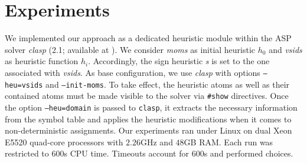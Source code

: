 
\section{Experiments}\label{sec:experiments}

We implemented our approach as a dedicated heuristic module within the ASP solver \textit{clasp}
(2.1; available at \cite{hclasp}).
We consider \textit{moms} \cite{pretolani96a} as initial heuristic $h_0$ and
\textit{vsids} \cite{momazhzhma01a} as heuristic function $h_i$.
Accordingly, the sign heuristic \textsl{s} is set to the one associated with \textit{vsids}.
As base configuration, we use \textit{clasp} with options \texttt{--heu=vsids} and \texttt{--init-moms}.
%
To take effect,
the heuristic atoms as well as their contained atoms must be made visible to the solver via \texttt{\#show} directives.
Once the option \texttt{--heu=domain} is passed to \texttt{clasp},
it extracts the necessary information from the symbol table and applies the heuristic modifications
when it comes to non-deterministic assignments.
%
Our experiments ran under Linux on dual Xeon E5520 quad-core processors with $2.26$GHz and $48$GB RAM.
Each run was restricted to 600s CPU time.
Timeouts account for 600s and performed choices.

